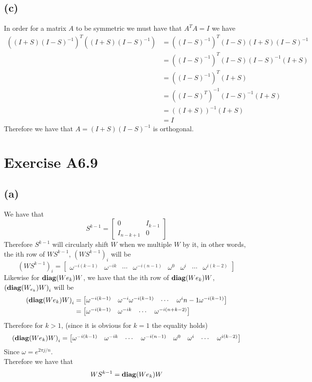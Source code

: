 \subsection*{(c)}
In order for a matrix $A$ to be symmetric we must have that 
$A^TA=I$ we have 
\begin{align*}
    \left((I+S)(I-S)^{-1}\right)^T\left((I+S)(I-S)^{-1}\right)&=
        \left((I-S)^{-1}\right)^T(I-S)(I+S)(I-S)^{-1}\\
        &=\left((I-S)^{-1}\right)^T(I-S)(I-S)^{-1}(I+S)\\
        &=\left((I-S)^{-1}\right)^T(I+S)\\
        &=\left((I-S)^{T}\right)^{-1}(I-S)^{-1}(I+S)\\
        &=\left((I+S)\right)^{-1}(I+S)\\
        &=I
\end{align*}
Therefore we have that $A=(I+S)(I-S)^{-1}$ is orthogonal.

\section*{Exercise A6.9}
\subsection*{(a)}
We have that 
$$S^{k-1}=\begin{bmatrix}
    0 & I_{k-1}\\
    I_{n-k+1} & 0
\end{bmatrix}$$
Therefore $S^{k-1}$ will circularly shift $W$ when we multiple $W$ by 
it, in other words, the ith row of $WS^{k-1}$, $\left(WS^{k-1}\right)_{i}$ will be 
$$\left(WS^{k-1}\right)_{i}=\begin{bmatrix}
    \omega^{-i(k-1)} & \omega^{-ik} & \cdots & \omega^{-i(n-1)} & \omega^0 & \omega^i & \cdots & \omega^{i(k-2)}
\end{bmatrix}$$ 
Likewise for $\text{\textbf{diag}}(We_{k})W$, we have that 
the ith row of $\text{\textbf{diag}}(We_{k})W$, $\left(\text{\textbf{diag}}(W_{e_{k}})W\right)_{i}$ will be
\begin{align*}
\left(\text{\textbf{diag}}(We_{k})W\right)_{i} &= \begin{bmatrix}
    \omega^{-i(k-1)} & \omega^{-i}\omega^{-i(k-1)}  & \cdots & \omega^i{n-1}\omega^{-i(k-1)}
\end{bmatrix} \\
&= \begin{bmatrix}
    \omega^{-i(k-1)} & \omega^{-ik} & \cdots & \omega^{-i(n+k-2)}
\end{bmatrix}
\end{align*}
Therefore for $k>1$, (since it is obvious for $k=1$ the equality holds)
$$\left(\text{\textbf{diag}}(We_{k})W\right)_{i}=
\begin{bmatrix}
    \omega^{-i(k-1)} & \omega^{-ik} & \cdots & \omega^{-i(n-1)} & \omega^0 & \omega^i & \cdots & \omega^{i(k-2)}
\end{bmatrix}
$$
Since $\omega=e^{2\pi j/n}$.\\
Therefore we have that
$$WS^{k-1}=\text{\textbf{diag}}(We_{k})W$$

